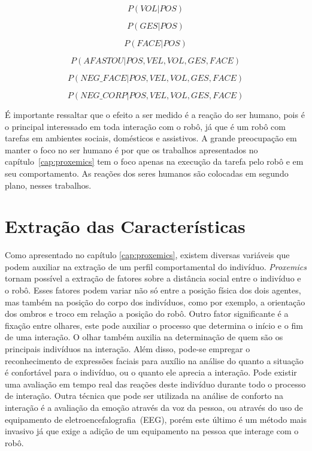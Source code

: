 \begin{equation}
	\label{eq:3}
	P(VOL|POS)
\end{equation}

\begin{equation}
	\label{eq:4}
	P(GES|POS)
\end{equation}

\begin{equation}
	\label{eq:5}
	P(FACE|POS)
\end{equation}

\begin{equation}
	\label{eq:6}
	P(AFASTOU|POS, VEL, VOL, GES, FACE)
\end{equation}

\begin{equation}
	\label{eq:7}
	P(NEG\_FACE|POS, VEL, VOL, GES, FACE)
\end{equation}

\begin{equation}
	\label{eq:8}
	P(NEG\_CORP|POS, VEL, VOL, GES, FACE)
\end{equation}

É importante ressaltar que o efeito a ser medido é a reação do ser humano, pois é o principal interessado em toda interação com o robô, já que é um robô com tarefas em ambientes sociais, domésticos e assistivos. A grande preocupação em manter o foco no ser humano é por que os trabalhos apresentados no capítulo~\ref{cap:proxemics} tem o foco apenas na execução da tarefa pelo robô e em seu comportamento. As reações dos seres humanos são colocadas em segundo plano, nesses trabalhos.

\section{Extração das Características}
\label{sec:extracaocaracteristicas}

Como apresentado no capítulo \ref{cap:proxemics}, existem diversas variáveis que podem auxiliar na extração de um perfil comportamental do indivíduo. \emph{Proxemics} tornam possível a extração de fatores sobre a distância social entre o indivíduo e o robô. Esses fatores podem variar não só entre a posição física dos dois agentes, mas também na posição do corpo dos indivíduos, como por exemplo, a orientação dos ombros e troco em relação a posição do robô. Outro fator significante é a fixação entre olhares, este pode auxiliar o processo que determina o início e o fim de uma interação. O olhar também auxilia na determinação de quem são os principais indivíduos na interação. Além disso, pode-se empregar o reconhecimento de expressões faciais para auxílio na análise do quanto a situação é confortável para o indivíduo, ou o quanto ele aprecia a interação. Pode existir uma avaliação em tempo real das reações deste indivíduo durante todo o processo de interação. Outra técnica que pode ser utilizada na análise de conforto na interação é a avaliação da emoção através da voz da pessoa, ou através do uso de equipamento de eletroencefalografia~(EEG), porém este último é um método mais invasivo já que exige a adição de um equipamento na pessoa que interage com o robô.

